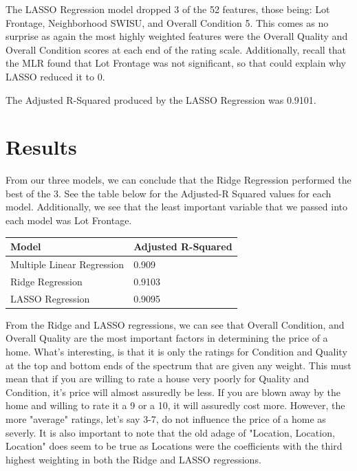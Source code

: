 \documentclass{article}
\begin{document}
	The LASSO Regression model dropped 3 of the 52 features, those being: Lot Frontage, Neighborhood SWISU, and Overall Condition 5. This comes as no surprise as again the most highly weighted features were the Overall Quality and Overall Condition scores at each end of the rating scale. Additionally, recall that the MLR found that Lot Frontage was not significant, so that could explain why LASSO reduced it to 0.

	The Adjusted R-Squared produced by the LASSO Regression was 0.9101.
	
	
	\section{Results}
	
	From our three models, we can conclude that the Ridge Regression performed the best of the 3. See the table below for the Adjusted-R Squared values for each model. Additionally, we see that the least important variable that we passed into each model was Lot Frontage.

	\begin{table}[H]
		\centering
		\begin{tabular}{ll}
		\hline
		\multicolumn{1}{|l|}{Model} & \multicolumn{1}{l|}{Adjusted R-Squared} \\ \hline
		Multiple Linear Regression  & 0.909                                   \\
		Ridge Regression            & 0.9103                                  \\
		LASSO Regression            & 0.9095                                 
		\end{tabular}
		\end{table}


	From the Ridge and LASSO regressions, we can see that Overall Condition, and Overall Quality are the most important factors in determining the price of a home. What's interesting, is that it is only the ratings for Condition and Quality at the top and bottom ends of the spectrum that are given any weight. This must mean that if you are willing to rate a house very poorly for Quality and Condition, it's price will almost assuredly be less. If you are blown away by the home and willing to rate it a 9 or a 10, it will assuredly cost more. However, the more "average" ratings, let's say 3-7, do not influence the price of a home as severly. It is also important to note that the old adage of "Location, Location, Location" does seem to be true as Locations were the coefficients with the third highest weighting in both the Ridge and LASSO regressions. 
	
\end{document}

